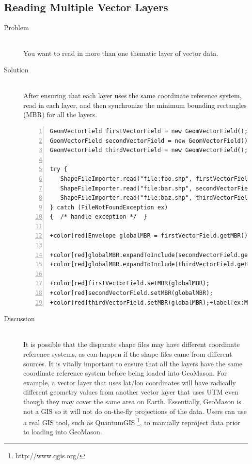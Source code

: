 \documentclass[twoside,10pt]{book}
\begin{document}
\subsection{Reading Multiple Vector Layers}
\label{sub:multiplevectorlayers}

\begin{description}
\item[Problem]~\\
You want to read in more than one thematic layer of vector
data.

\item[Solution]~\\
After ensuring that each layer uses the same coordinate reference
system, read in each layer, and then synchronize the minimum bounding
rectangles (MBR) for all the layers.
\begin{Verbatim}[frame=lines,framesep=5mm,numbers=left,commandchars=+\[\]]
GeomVectorField firstVectorField = new GeomVectorField();
GeomVectorField secondVectorField = new GeomVectorField();
GeomVectorField thirdVectorField = new GeomVectorField();

try {
   ShapeFileImporter.read("file:foo.shp", firstVectorField);
   ShapeFileImporter.read("file:bar.shp", secondVectorField);
   ShapeFileImporter.read("file:baz.shp", thirdVectorField);
} catch (FileNotFoundException ex)
{  /* handle exception */  }

+color[red]Envelope globalMBR = firstVectorField.getMBR();+label[ex:MBRstart]

+color[red]globalMBR.expandToInclude(secondVectorField.getMBR());
+color[red]globalMBR.expandToInclude(thirdVectorField.getMBR());

+color[red]firstVectorField.setMBR(globalMBR);
+color[red]secondVectorField.setMBR(globalMBR);
+color[red]thirdVectorField.setMBR(globalMBR);+label[ex:MBRend]
\end{Verbatim}

\item[Discussion]~\\
It is possible that the disparate shape files may have different
coordinate reference systems, as can happen if the shape files came
from different sources.  It is vitally important to ensure that all
the layers have the same coordinate reference system before being
loaded into GeoMason.  For example, a vector layer that uses lat/lon coordinates
will have radically different geometry values from another vector layer that
uses UTM even though they may cover the same area on Earth.
Essentially, GeoMason is not a GIS so it will not do
on-the-fly projections of the data.  Users can use a real GIS tool,
such as QuantumGIS \footnote{http://www.qgis.org/}, to manually
reproject data prior to loading into GeoMason.


\end{description}
\end{document}
